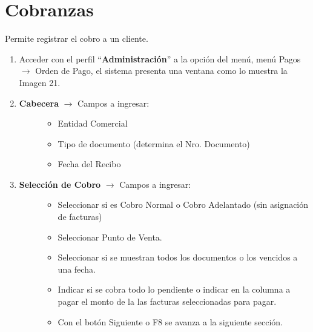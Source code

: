 \documentclass[letterpaper,10pt,spanish]{sphinxmanual}
\begin{document}
\section{Cobranzas}
\label{ventas:cobranzas}
Permite registrar el cobro a un cliente.
\begin{enumerate}
\item {} 
Acceder con el perfil ``\textbf{Administración}'' a la opción del menú, menú Pagos \(\rightarrow\)  Orden de Pago, el sistema presenta una ventana como lo muestra la Imagen 21.

\item {} \begin{description}
\item[{\textbf{Cabecera} \(\rightarrow\) Campos a ingresar:}] \leavevmode\begin{itemize}
\item {} 
Entidad Comercial

\item {} 
Tipo de documento (determina el Nro. Documento)

\item {} 
Fecha del Recibo

\end{itemize}

\end{description}

\item {} \begin{description}
\item[{\textbf{Selección de Cobro} \(\rightarrow\) Campos a ingresar:}] \leavevmode\begin{itemize}
\item {} 
Seleccionar si es Cobro Normal o Cobro Adelantado (sin asignación de facturas)

\item {} 
Seleccionar Punto de Venta.

\item {} 
Seleccionar si se muestran todos los documentos o los vencidos a una fecha.

\item {} 
Indicar si se cobra todo lo pendiente o indicar en la columna a pagar el monto de la las facturas seleccionadas para pagar.

\item {} 
Con el botón Siguiente o F8 se avanza a la siguiente sección.

\end{itemize}


\end{description}
\end{enumerate}
\end{document}
